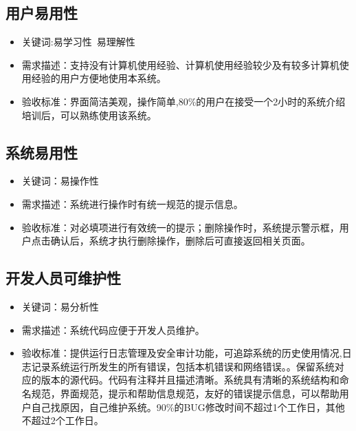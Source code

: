 \documentclass[hyperref, a4paper]{ctexart}
\providecommand{\tightlist}{%
  \setlength{\itemsep}{0pt}\setlength{\parskip}{0pt}}
\begin{document}
\hypertarget{ux7528ux6237ux6613ux7528ux6027}{%
\subsection{用户易用性}\label{ux7528ux6237ux6613ux7528ux6027}}

\begin{itemize}
\tightlist
\item
  关键词:易学习性~易理解性
\item
  需求描述：支持没有计算机使用经验、计算机使用经验较少及有较多计算机使用经验的用户方便地使用本系统。
\item
  验收标准：界面简洁美观，操作简单,80\%的用户在接受一个2小时的系统介绍培训后，可以熟练使用该系统。
\end{itemize}

\hypertarget{ux7cfbux7edfux6613ux7528ux6027}{%
\subsection{系统易用性}\label{ux7cfbux7edfux6613ux7528ux6027}}

\begin{itemize}
\tightlist
\item
  关键词：易操作性
\item
  需求描述：系统进行操作时有统一规范的提示信息。
\item
  验收标准：对必填项进行有效统一的提示；删除操作时，系统提示警示框，用户点击确认后，系统才执行删除操作，删除后可直接返回相关页面。
\end{itemize}

\hypertarget{ux5f00ux53d1ux4ebaux5458ux53efux7ef4ux62a4ux6027}{%
\subsection{开发人员可维护性}\label{ux5f00ux53d1ux4ebaux5458ux53efux7ef4ux62a4ux6027}}

\begin{itemize}
\tightlist
\item
  关键词：易分析性
\item
  需求描述：系统代码应便于开发人员维护。
\item
  验收标准：提供运行日志管理及安全审计功能，可追踪系统的历史使用情况,日志记录系统运行所发生的所有错误，包括本机错误和网络错误。。保留系统对应的版本的源代码。代码有注释并且描述清晰。系统具有清晰的系统结构和命名规范，界面规范，提示和帮助信息规范，友好的错误提示信息，可以帮助用户自己找原因，自己维护系统。90\%的BUG修改时间不超过1个工作日，其他不超过2个工作日。
\end{itemize}
\end{document}
